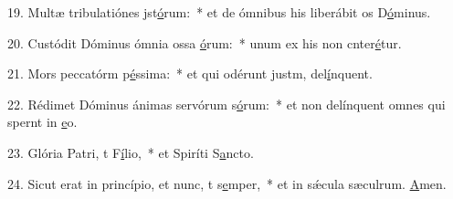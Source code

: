 19. Multæ tribulatiónes jst\uline{ó}rum:~* et de ómnibus his liberábit os D\uline{ó}minus.\par 
20. Custódit Dóminus ómnia ossa \uline{ó}rum:~* unum ex his non cnter\uline{é}tur.\par 
21. Mors peccatórm p\uline{é}ssima:~* et qui odérunt justm, del\uline{í}nquent.\par 
22. Rédimet Dóminus ánimas servórum s\uline{ó}rum:~* et non delínquent omnes qui spernt in \uline{e}o.\par 
23. Glória Patri, t F\uline{í}lio,~* et Spiríti S\uline{a}ncto.\par 
24. Sicut erat in princípio, et nunc, t s\uline{e}mper,~* et in sǽcula sæculrum. \uline{A}men.\par 

